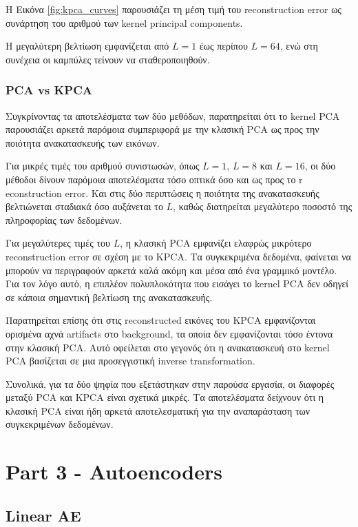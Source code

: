 \documentclass[12pt]{article}
\begin{document}
Η Εικόνα \ref{fig:kpca_curves} παρουσιάζει τη μέση τιμή του reconstruction error ως συνάρτηση του αριθμού των kernel principal components.

Η μεγαλύτερη βελτίωση εμφανίζεται από $L=1$ έως περίπου $L=64$, ενώ στη συνέχεια οι καμπύλες τείνουν να σταθεροποιηθούν.



\subsubsection{PCA vs KPCA}
Συγκρίνοντας τα αποτελέσματα των δύο μεθόδων, παρατηρείται ότι το kernel PCA παρουσιάζει αρκετά παρόμοια συμπεριφορά με την κλασική PCA ως προς την 
ποιότητα ανακατασκευής των εικόνων.

Για μικρές τιμές του αριθμού συνιστωσών, όπως $L=1$, $L=8$ και $L=16$, οι δύο μέθοδοι δίνουν παρόμοια αποτελέσματα τόσο οπτικά όσο και ως προς το r
econstruction error. Και στις δύο περιπτώσεις η ποιότητα της ανακατασκευής βελτιώνεται σταδιακά όσο αυξάνεται το $L$, καθώς διατηρείται μεγαλύτερο 
ποσοστό της πληροφορίας των δεδομένων.

Για μεγαλύτερες τιμές του $L$, η κλασική PCA εμφανίζει ελαφρώς μικρότερο reconstruction error σε σχέση με το KPCA. Τα συγκεκριμένα δεδομένα, 
φαίνεται να μπορούν να περιγραφούν αρκετά καλά ακόμη και μέσα από ένα γραμμικό μοντέλο. Για τον λόγο αυτό, η επιπλέον πολυπλοκότητα που εισάγει το 
kernel PCA δεν οδηγεί σε κάποια σημαντική βελτίωση της ανακατασκευής.

Παρατηρείται επίσης ότι στις reconstructed εικόνες του KPCA εμφανίζονται ορισμένα αχνά artifacts στο background, τα οποία δεν εμφανίζονται τόσο 
έντονα στην κλασική PCA. Αυτό οφείλεται στο γεγονός ότι η ανακατασκευή στο kernel PCA βασίζεται σε μια προσεγγιστική inverse transformation.

Συνολικά, για τα δύο ψηφία που εξετάστηκαν στην παρούσα εργασία, οι διαφορές μεταξύ PCA και KPCA είναι σχετικά μικρές. Τα αποτελέσματα δείχνουν 
ότι η κλασική PCA είναι ήδη αρκετά αποτελεσματική για την αναπαράσταση των συγκεκριμένων δεδομένων.

\section{Part 3 - Autoencoders}

\subsection{Linear AE}
\end{document}
